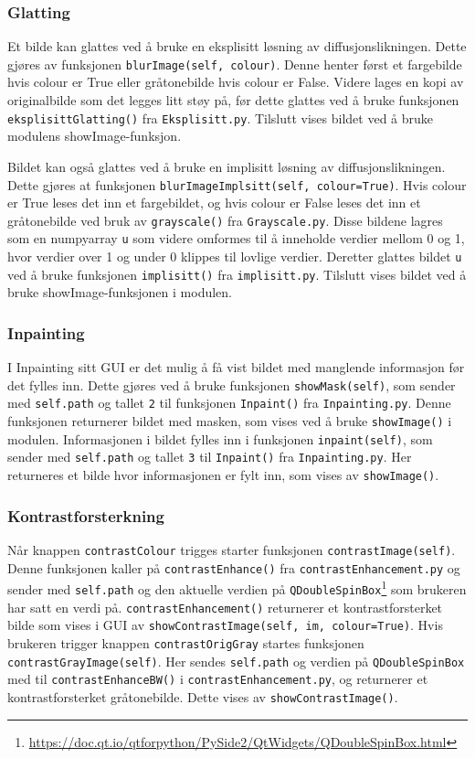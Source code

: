 \subsubsection{Glatting}
Et bilde kan glattes ved å bruke en eksplisitt løsning av diffusjonslikningen. Dette gjøres av funksjonen \texttt{blurImage(self, colour)}. Denne henter først et fargebilde hvis colour er True eller gråtonebilde hvis colour er False. Videre lages en kopi av originalbilde som det legges litt støy på, før dette glattes ved å bruke funksjonen \texttt{eksplisittGlatting()} fra \texttt{Eksplisitt.py}. Tilslutt vises bildet ved å bruke modulens showImage-funksjon.

Bildet kan også glattes ved å bruke en implisitt løsning av diffusjonslikningen. Dette gjøres at funksjonen \texttt{blurImageImplsitt(self, colour=True)}. Hvis colour er True leses det inn et fargebildet, og hvis colour er False leses det inn et gråtonebilde ved bruk av \texttt{grayscale()} fra \texttt{Grayscale.py}. Disse bildene lagres som en numpyarray \texttt{u} som videre omformes til å inneholde verdier mellom 0 og 1, hvor verdier over 1 og under 0 klippes til lovlige verdier. Deretter glattes bildet \texttt{u} ved å bruke funksjonen \texttt{implisitt()} fra \texttt{implisitt.py}. Tilslutt vises bildet ved å bruke showImage-funksjonen i modulen.

\subsubsection{Inpainting}
I Inpainting sitt GUI er det mulig å få vist bildet med manglende informasjon før det fylles inn. Dette gjøres ved å bruke funksjonen \texttt{showMask(self)}, som sender med \texttt{self.path} og tallet \texttt{2} til funksjonen \texttt{Inpaint()} fra \texttt{Inpainting.py}. Denne funksjonen returnerer bildet med masken, som vises ved å bruke \texttt{showImage()} i modulen. Informasjonen i bildet fylles inn i funksjonen \texttt{inpaint(self)}, som sender med \texttt{self.path} og tallet \texttt{3} til \texttt{Inpaint()} fra \texttt{Inpainting.py}. Her returneres et bilde hvor informasjonen er fylt inn, som vises av \texttt{showImage()}. 

\subsubsection{Kontrastforsterkning}
Når knappen \texttt{contrastColour} trigges starter funksjonen \texttt{contrastImage(self)}. Denne funksjonen kaller på \texttt{contrastEnhance()} fra \texttt{contrastEnhancement.py} og sender med \texttt{self.path} og den aktuelle verdien på \texttt{QDoubleSpinBox}\footnote{\url{https://doc.qt.io/qtforpython/PySide2/QtWidgets/QDoubleSpinBox.html}} som brukeren har satt en verdi på. \texttt{contrastEnhancement()} returnerer et kontrastforsterket bilde som vises i GUI av \texttt{showContrastImage(self, im, colour=True)}. Hvis brukeren trigger knappen \texttt{contrastOrigGray} startes funksjonen \texttt{contrastGrayImage(self)}. Her sendes \texttt{self.path} og verdien på \texttt{QDoubleSpinBox} med til \texttt{contrastEnhanceBW()} i \texttt{contrastEnhancement.py}, og returnerer et kontrastforsterket gråtonebilde. Dette vises av \texttt{showContrastImage()}.

